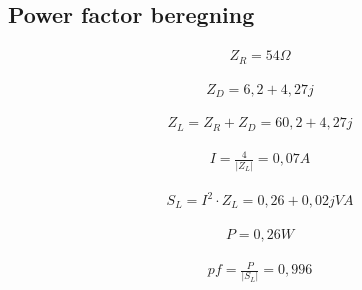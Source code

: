 \subsection{Power factor beregning}

\begin{align}
Z_R=54 \Omega
\end{align}

\begin{align}
Z_D=6,2+4,27j
\end{align}

\begin{align}
Z_L=Z_R+Z_D=60,2+4,27j
\end{align}

\begin{align}
I=\frac{4}{\vert Z_L \vert} = 0,07 A
\end{align}

\begin{align}
S_L=I^2\cdot Z_L = 0,26+0,02j VA
\end{align}

\begin{align}
P=0,26 W
\end{align}

\begin{align}
pf= \frac{P}{\vert S_L \vert} = 0,996
\end{align}